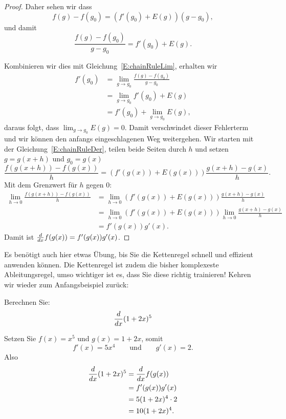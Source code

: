 \begin{proof}
\vspace{2cm}

Daher sehen wir dass
\begin{equation}\label{E:chainRuleDer}
f(g)-f(g_0) = \left(f'(g_0) + E(g)\right)(g-g_0),
\end{equation}
und damit
\[
\frac{f(g)-f(g_0)}{g-g_0} = f'(g_0) + E(g).
\]


Kombinieren wir dies mit Gleichung~\ref{E:chainRuleLim}, erhalten wir
\begin{align*}
f'(g_0) &= \lim_{g\to g_0}\frac{f(g)-f(g_0)}{g-g_0} \\
&= \lim_{g\to g_0}f'(g_0) + E(g)\\
&= f'(g_0) + \lim_{g\to g_0} E(g),
\end{align*}
daraus folgt, dass $\lim_{g\to g_0} E(g) = 0$. Damit verschwindet dieser Fehlerterm und wir können den anfangs eingeschlagenen Weg weitergehen. Wir starten mit der Gleichung~\ref{E:chainRuleDer}, teilen beide Seiten durch $h$ und setzen
$g=g(x+h)$ und $g_0=g(x)$
\[
\frac{f(g(x+h))-f(g(x))}{h} = \left(f'(g(x)) +
E(g(x))\right)\frac{g(x+h)-g(x)}{h}.
\]
Mit dem Grenzwert für $h$ gegen $0$:
\begin{align*}
\lim_{h\to 0}\frac{f(g(x+h))-f(g(x))}{h} &= \lim_{h\to 0}\left(f'(g(x))
+ E(g(x))\right)\frac{g(x+h)-g(x)}{h}\\
&= \lim_{h\to 0}\left(f'(g(x))
+ E(g(x))\right)\lim_{h\to 0}\frac{g(x+h)-g(x)}{h}\\
&= f'(g(x))g'(x).
\end{align*}
Damit ist $\frac{d}{dx} f(g(x))= f'(g(x))g'(x)$.
\end{proof}

Es benötigt auch hier etwas Übung, bis Sie die Kettenregel schnell und effizient anwenden können. Die Kettenregel ist zudem die bisher komplexeste Ableitungsregel, umso wichtiger ist es, dass Sie diese richtig trainieren!
Kehren wir wieder zum Anfangsbeispiel zurück:

\begin{example}
Berechnen Sie:
\[
\frac{d}{dx} (1+2x)^5
\]
\end{example}

\begin{solution}
Setzen Sie $f(x) = x^5$ und $g(x) = 1+2x$, somit
\[
f'(x) = 5x^4 \qquad\text{und}\qquad g'(x) = 2.
\]
Also
\begin{align*}
\frac{d}{dx} (1+2x)^5 &= \frac{d}{dx} f(g(x))\\ 
&=f'(g(x))g'(x) \\
&= 5(1+2x)^4\cdot 2\\
&= 10(1+2x)^4.
\end{align*}
\end{solution}


